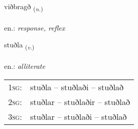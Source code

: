 \documentclass[frontgrid, backgrid]{flacards}\usepackage[]{graphicx}\usepackage[]{xcolor}
\begin{document}
\renewcommand{\flhead}{\vskip5pt \fboxsep=0pt {\small\bfseries\footnotesize Nafnorð | Noun}}
\renewcommand{\fcfoot}{\vskip5pt \fboxsep=0pt \hspace{2pt}{\small\bfseries\footnotesize 1K}}

\renewcommand{\blhead}{\vskip5pt {\small\bfseries\footnotesize Nafnorð | Noun }}
\renewcommand{\bcfoot}{\vskip5pt \hspace{2pt}{\small\bfseries\footnotesize 1K}}


{viðbragð \small{\textsubscript{(\textit{n.})}} \\[1ex] %
\textphonetic{[vɪðpraɣð]} \\
en.: \emph{response, reflex} \\  [2ex]
\renewcommand*{\arraystretch}{0.8}
}

\renewcommand{\flhead}{\vskip5pt \fboxsep=0pt {\small\bfseries\footnotesize Sagnorð | Verb}}
\renewcommand{\fcfoot}{\vskip5pt \fboxsep=0pt \hspace{2pt}{\small\bfseries\footnotesize 1K}}

\renewcommand{\blhead}{\vskip5pt {\small\bfseries\footnotesize Sagnorð | Verb }}
\renewcommand{\bcfoot}{\vskip5pt \hspace{2pt}{\small\bfseries\footnotesize 1K}}


{stuðla \small{\textsubscript{(\textit{v.})}} \\[1ex] %
\textphonetic{[stʏðla]} \\
en.: \emph{alliterate} \\  [2ex]
\renewcommand*{\arraystretch}{0.8}
\begin{tabular}{p{1cm}l}
\textsc{1sg}: & stuðla -- stuðlaði -- stuðlað \\ 
\textsc{2sg}: & stuðlar -- stuðlaðir -- stuðlað \\ 
\textsc{3sg}: & stuðlar -- stuðlaði -- stuðlað \\ 
\end{tabular}
}
\end{document}
